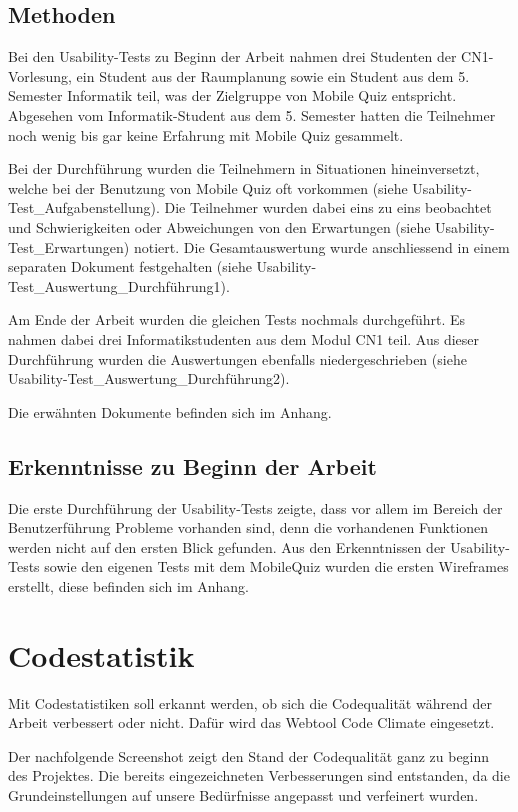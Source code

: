\subsection{Methoden}
Bei den \gls{Usability-Tests} zu Beginn der Arbeit nahmen drei Studenten der \acrfull{CN1}-Vorlesung, ein Student aus der Raumplanung sowie ein Student aus dem 5. Semester Informatik teil, was der Zielgruppe von Mobile Quiz entspricht. Abgesehen vom Informatik-Student aus dem 5. Semester hatten die Teilnehmer noch wenig bis gar keine Erfahrung mit Mobile Quiz gesammelt.

Bei der Durchführung wurden die Teilnehmern in Situationen hineinversetzt, welche bei der Benutzung von Mobile Quiz oft vorkommen (siehe Usability-Test\_Aufgabenstellung). Die Teilnehmer wurden dabei eins zu eins beobachtet und Schwierigkeiten oder Abweichungen von den Erwartungen (siehe Usability-Test\_Erwartungen) notiert. Die Gesamtauswertung wurde anschliessend in einem separaten Dokument festgehalten (siehe Usability-Test\_Auswertung\_Durchführung1).

Am Ende der Arbeit wurden die gleichen Tests nochmals durchgeführt. Es nahmen dabei drei Informatikstudenten aus dem Modul \gls{CN1} teil. Aus dieser Durchführung wurden die Auswertungen ebenfalls niedergeschrieben (siehe Usability-Test\_Auswertung\_Durchführung2).

Die erwähnten Dokumente befinden sich im Anhang.



\subsection{Erkenntnisse zu Beginn der Arbeit}
Die erste Durchführung der \gls{Usability-Tests} zeigte, dass vor allem im Bereich der Benutzerführung Probleme vorhanden sind, denn die vorhandenen Funktionen werden nicht auf den ersten Blick gefunden.
Aus den Erkenntnissen der \gls{Usability-Tests} sowie den eigenen Tests mit dem MobileQuiz wurden die ersten \gls{Wireframes} erstellt, diese befinden sich im Anhang.


\section{Codestatistik}
Mit Codestatistiken soll erkannt werden, ob sich die Codequalität während der Arbeit verbessert oder nicht. Dafür wird das Webtool Code Climate eingesetzt.

Der nachfolgende Screenshot zeigt den Stand der Codequalität ganz zu beginn des Projektes. Die bereits eingezeichneten Verbesserungen sind entstanden, da die Grundeinstellungen auf unsere Bedürfnisse angepasst und verfeinert wurden.


